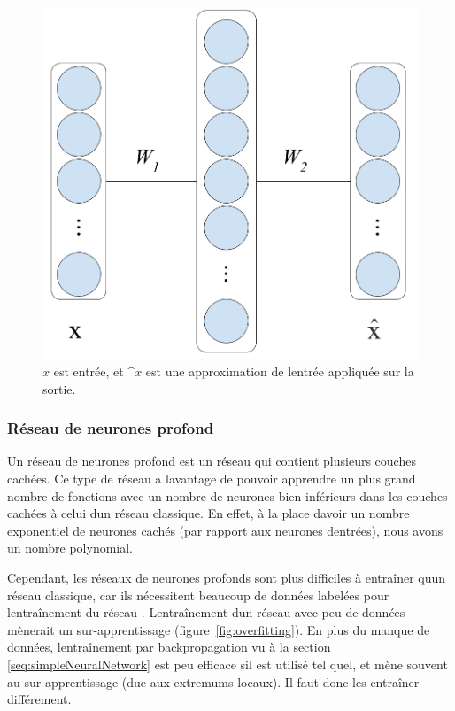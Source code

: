 \documentclass[11pt,final,ENIB]{sdm}
\begin{document}
			\begin{figure}[!ht]
				\centering
				\includegraphics[scale=0.15,natwidth=893,natheight=837]{figures/autoencoder.png}
				\caption{$x$ est \textquotesingle entr\'ee, et $\^x$ est une approximation de l\textquotesingle entr\'ee appliqu\'ee sur la sortie.}
				\label{fig:autoencoder}
			\end{figure}

			



			\medbreak

		\subsubsection{R\'eseau de neurones profond}
		\label{seq:DeepNetwork}
			Un r\'eseau de neurones profond est un r\'eseau qui contient plusieurs couches cach\'ees. Ce type de r\'eseau a l\textquotesingle avantage de pouvoir apprendre un plus grand nombre de fonctions avec un nombre de neurones bien inf\'erieurs dans les couches cach\'ees \`a celui d\textquotesingle un r\'eseau classique. En effet, \`a la place d\textquotesingle avoir un nombre exponentiel de neurones cach\'es (par rapport aux neurones d\textquotesingle entr\'ees), nous avons un nombre polynomial.
			
			Cependant, les r\'eseaux de neurones profonds sont plus difficiles \`a entra\^iner qu\textquotesingle un r\'eseau classique, car ils n\'ecessitent beaucoup de donn\'ees label\'ees pour l\textquotesingle entra\^inement du r\'eseau \cite{krizhevsky2012imagenet}\cite{howard2013some}. L\textquotesingle entra\^inement d\textquotesingle un r\'eseau avec peu de donn\'ees m\`enerait un sur-apprentissage (figure~\ref{fig:overfitting}). 
			En plus du manque de donn\'ees, l\textquotesingle entra\^inement par backpropagation vu \`a la section \ref{seq:simpleNeuralNetwork} est peu efficace s\textquotesingle il est utilis\'e tel quel, et m\`ene souvent au sur-apprentissage (due aux extremums locaux). Il faut donc les entra\^iner diff\'erement.
\end{document}
